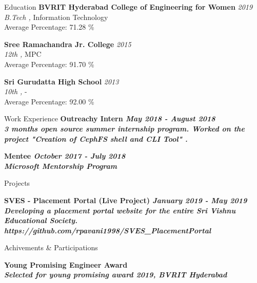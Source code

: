 \documentclass{resume}
\begin{document}
   
   
   
   \begin{rSection}{Education}
    {\bf BVRIT Hyderabad College of Engineering for Women} \hfill {\em 2019 } \\
	   {\sl B.Tech ,} Information Technology\\
	   Average Percentage: 71.28 \% 
		
	    {\bf Sree Ramachandra Jr. College} \hfill {\em 2015 } \\
	   {\sl 12th ,} MPC\\
	   Average Percentage: 91.70 \% 
		
	    {\bf Sri Gurudatta High School} \hfill {\em 2013 } \\
	   {\sl 10th ,} -\\
	   Average Percentage: 92.00 \% 
		
	   
   \end{rSection}
   
   
   \begin{rSection}{Work Experience}
     \bf Outreachy Intern \hfill {\em May 2018 - August 2018 } \\
	   \sl 3 months open source summer internship program. Worked on the project "Creation of CephFS shell and CLI Tool" .
	   \
	   
	     \bf Mentee \hfill {\em October 2017 - July 2018 } \\
	   \sl Microsoft Mentorship Program
	   \
	   
	   
 
   \end{rSection}
   
   \begin{rSection}{Projects}
   

    \bf SVES - Placement Portal (Live Project) \hfill{\em January 2019 - May 2019}\\
	\textit{ Developing a placement portal website for the entire Sri Vishnu Educational Society.}\\
	\sl https://github.com/rpavani1998/SVES_PlacementPortal \\
 
   \end{rSection}
   
   
   \begin{rSection}{Achivements \& Participations}

   \bf Young Promising Engineer Award\\
	   \sl  Selected for young promising award 2019, BVRIT Hyderabad\\
   \end{rSection}
   
\end{document}
